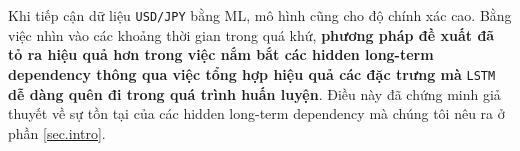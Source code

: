 \documentclass[aps,prb,groupedaddress,twocolumn,showpacs,dvipdfmx,superscriptaddress,pdftex]{revtex4-2}
\begin{document}

\vspace{2mm}

Khi tiếp cận dữ liệu \verb|USD/JPY| bằng ML, mô hình cũng cho độ chính xác cao. Bằng việc nhìn vào các khoảng thời gian trong quá khứ, \textbf{phương pháp đề xuất đã tỏ ra hiệu quả hơn trong việc nắm bắt các hidden long-term dependency thông qua việc tổng hợp hiệu quả các đặc trưng mà} \verb|LSTM| \textbf{dễ dàng quên đi trong quá trình huấn luyện}. Điều này đã chứng minh giả thuyết về sự tồn tại của các hidden long-term dependency mà chúng tôi nêu ra ở phần \ref{sec.intro}.


\vspace{2mm}
\end{document}

